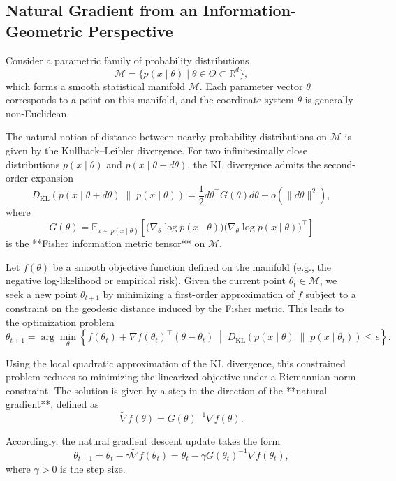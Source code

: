\documentclass[12pt]{article}
\begin{document}
\subsection*{Natural Gradient from an Information-Geometric Perspective}

Consider a parametric family of probability distributions
\[
\mathcal{M} = \{ p(x \mid \theta) \mid \theta \in \Theta \subset \mathbb{R}^d \},
\]
which forms a smooth statistical manifold \(\mathcal{M}\). Each parameter vector \(\theta\) corresponds to a point on this manifold, and the coordinate system \(\theta\) is generally non-Euclidean.

The natural notion of distance between nearby probability distributions on \(\mathcal{M}\) is given by the Kullback--Leibler divergence. For two infinitesimally close distributions \(p(x \mid \theta)\) and \(p(x \mid \theta + d\theta)\), the KL divergence admits the second-order expansion
\[
D_{\mathrm{KL}}\!\left(
p(x \mid \theta + d\theta)
\;\|\;
p(x \mid \theta)
\right)
=
\frac{1}{2}
d\theta^\top
G(\theta)
d\theta
+
o(\|d\theta\|^2),
\]
where
\[
G(\theta)
=
\mathbb{E}_{x \sim p(x \mid \theta)}
\left[
\bigl( \nabla_\theta \log p(x \mid \theta) \bigr)
\bigl( \nabla_\theta \log p(x \mid \theta) \bigr)^\top
\right]
\]
is the **Fisher information metric tensor** on \(\mathcal{M}\).

Let \(f(\theta)\) be a smooth objective function defined on the manifold (e.g., the negative log-likelihood or empirical risk). Given the current point \(\theta_t \in \mathcal{M}\), we seek a new point \(\theta_{t+1}\) by minimizing a first-order approximation of \(f\) subject to a constraint on the geodesic distance induced by the Fisher metric. This leads to the optimization problem
\[
\theta_{t+1}
=
\arg\min_{\theta}
\left\{
f(\theta_t)
+
\nabla f(\theta_t)^\top (\theta - \theta_t)
\;\middle|\;
D_{\mathrm{KL}}\!\left(
p(x \mid \theta)
\;\|\;
p(x \mid \theta_t)
\right)
\le \epsilon
\right\}.
\]

Using the local quadratic approximation of the KL divergence, this constrained problem reduces to minimizing the linearized objective under a Riemannian norm constraint. The solution is given by a step in the direction of the **natural gradient**, defined as
\[
\widetilde{\nabla} f(\theta)
=
G(\theta)^{-1}
\nabla f(\theta).
\]

Accordingly, the natural gradient descent update takes the form
\[
\theta_{t+1}
=
\theta_t
-
\gamma
\widetilde{\nabla} f(\theta_t)
=
\theta_t
-
\gamma
G(\theta_t)^{-1}
\nabla f(\theta_t),
\]
where \(\gamma > 0\) is the step size.
\end{document}

